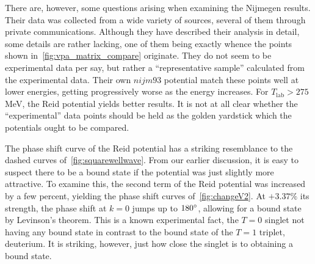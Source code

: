 There are, however, some questions arising when examining the Nijmegen
results. Their data was collected from a wide variety of sources, several of
them through private communications. Although they have described their analysis
in detail, some details are rather lacking, one of them being exactly whence the
points shown in~\cref{fig:vpa_matrix_compare} originate. They do not seem to be
experimental data per say, but rather a ``representative sample'' calculated
from the experimental data. Their own \(nijm93\) potential match these points
well at lower energies, getting progressively worse as the energy increases. For
\(T_{\text{lab}}>275\) MeV, the Reid potential yields better results. It is not at
all clear whether the ``experimental'' data points should be held as the golden
yardstick which the potentials ought to be compared. 



The phase shift curve of the Reid potential has a striking resemblance to the
dashed curves of~\cref{fig:squarewellwave}. From our earlier discussion, it is
easy to suspect
there to be a bound state if the potential was just slightly more
attractive. To examine this, the second term of the Reid potential was increased
by a few percent, yielding the phase shift curves of~\cref{fig:changeV2}. At
\(+3.37\%\) its strength, the phase shift at \(k=0\) jumps up to \(180\degree\),
allowing for a bound state by Levinson's theorem. This is a known experimental
fact, the \(T=0\) singlet not having any bound state in contrast to the bound state of
the \(T=1\) triplet, deuterium. It is striking, however, just how close the
singlet is to obtaining a bound state. 

